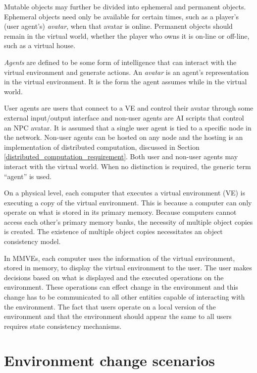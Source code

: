 Mutable objects may further be divided into ephemeral and permanent objects. Ephemeral objects need only be available for certain times, such as a player's (user agent's) \emph{avatar}, when that avatar is online. Permanent objects should remain in the virtual world, whether the player who owns it is on-line or off-line, such as a virtual house.

\emph{Agents} are defined to be some form of intelligence that can interact with the virtual environment and generate actions. An \emph{avatar} is an agent's representation in the virtual environment. It is the form the agent assumes while in the virtual world.

User agents are users that connect to a VE and control their avatar through some external input/output interface and non-user agents are AI scripts that control an NPC avatar. It is assumed that a single user agent is tied to a specific node in the network. Non-user agents can be hosted on any node and the hosting is an implementation of distributed computation, discussed in Section \ref{distributed_computation_requirement}. Both user and non-user agents may interact with the virtual world. When no distinction is required, the generic term ``agent'' is used.

On a physical level, each computer that executes a virtual environment (VE) is executing a copy of the virtual environment. This is because a computer can only operate on what is stored in its primary memory. Because computers cannot access each other's primary memory banks, the necessity of multiple object copies is created. The existence of multiple object copies necessitates an object consistency model.

In MMVEs, each computer uses the information of the virtual environment, stored in memory, to display the virtual environment to the user. The user makes decisions based on what is displayed and the executed operations on the environment. These operations can effect change in the environment and this change has to be communicated to all other entities capable of interacting with the environment. The fact that users operate on a local version of the environment and that the environment should appear the same to all users requires state consistency mechanisms.

\section{Environment change scenarios}
\label{environment_change_scenarios}

